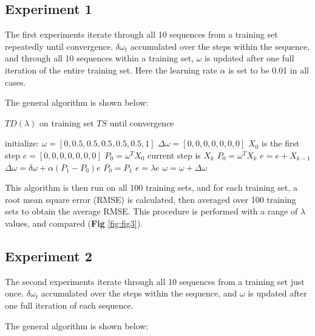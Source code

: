 \documentclass[10pt]{article}
\begin{document}


\subsection{Experiment 1} \label{experiment1}
The first experiments iterate through all 10 sequences from a training set repeatedly until convergence. $\delta \omega_t$ accumulated over the steps within the sequence, and through all 10 sequences within a training set, $\omega$ is updated after one full iteration of the entire training set. Here the learning rate $\alpha$ is set to be 0.01 in all cases.\par
\noindent
The general algorithm is shown below:\par

\begin{algorithm}
\caption{$TD(\lambda)$ on training set $TS$ until convergence}
\begin{algorithmic}
\STATE initialize: $\omega=[0,0.5,0.5,0.5,0.5,0.5,1]$
\REPEAT
\STATE $\Delta\omega=[0,0,0,0,0,0,0]$
\STATE $X_0$ is the first step
\STATE $e=[0,0,0,0,0,0,0]$
\STATE $P_0=\omega^T X_0$
\STATE current step is $X_k$
\STATE $P_0=\omega^T X_k$
\STATE $e=e+X_{k-1}$
\STATE $\Delta\omega=\delta\omega+\alpha (P_1-P_0)e$
\STATE $P_0=P_1$
\STATE $e=\lambda e$
\ENDFOR
\ENDFOR
\STATE $\omega=\omega+\Delta\omega$
\UNTIL{$\Delta\omega<\epsilon$}
\end{algorithmic}
\end{algorithm}

This algorithm is then run on all 100 training sets, and for each training set, a root mean square error (RMSE) is calculated, then averaged over 100 training sets to obtain the average RMSE. This procedure is performed with a range of $\lambda$ values, and compared (\textbf{Fig} \ref{fig:fig3}).





\subsection{Experiment 2} \label{experiment2}
The second experiments iterate through all 10 sequences from a training set just once. $\delta \omega_t$ accumulated over the steps within the sequence, and $\omega$ is updated after one full iteration of each sequence.\par
\noindent
The general algorithm is shown below:\par
\end{document}
